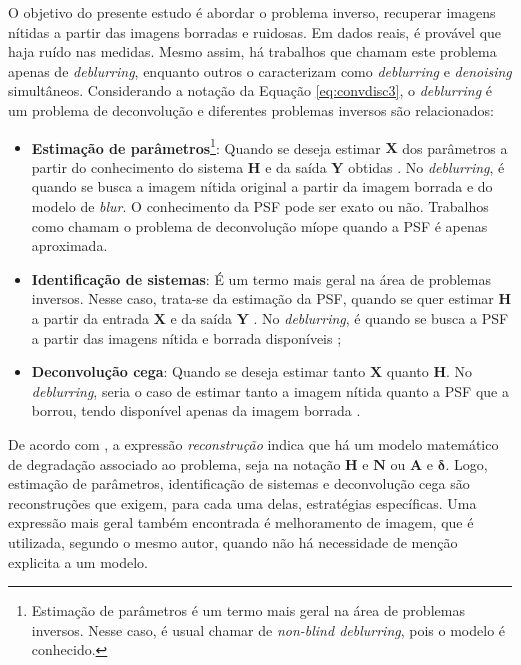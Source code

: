 O objetivo do presente estudo é abordar o problema inverso, recuperar imagens nítidas a partir das imagens borradas e ruidosas. Em dados reais, é provável que haja ruído nas medidas. Mesmo assim, há trabalhos que chamam este problema apenas de \textit{deblurring}, enquanto outros o caracterizam como \textit{deblurring} e \textit{denoising} simultâneos. Considerando a notação da Equação \eqref{eq:convdisc3}, o \textit{deblurring} é um problema de deconvolução e diferentes problemas inversos são relacionados:
\begin{itemize}
\item \textbf{Estimação de parâmetros}\footnote{Estimação de parâmetros é um termo mais geral na área de problemas inversos. Nesse caso, é usual chamar de \textit{non-blind deblurring}, pois o modelo é conhecido.}: Quando se deseja estimar $\mathbf{X}$ dos parâmetros a partir do conhecimento do sistema $\mathbf{H}$ e da saída $\mathbf{Y}$ obtidas \cite{aster2019parameter}. No \textit{deblurring}, é quando se busca a imagem nítida original a partir da imagem borrada e do modelo de \textit{blur}. O conhecimento da PSF pode ser exato ou não. Trabalhos como \cite{Bertero2009} chamam o problema de deconvolução míope quando a PSF é apenas aproximada. 


\item \textbf{Identificação de sistemas}: É um termo mais geral na área de problemas inversos. Nesse caso, trata-se da estimação da PSF, quando se quer estimar $\mathbf{H}$ a partir da entrada $\mathbf{X}$ e da saída $\mathbf{Y}$ \cite{aster2019parameter, baumeister2005topics}. No \textit{deblurring}, é quando se busca a PSF a partir das imagens nítida e borrada disponíveis \cite[págs. 15, 24]{meresescu2018};
\item \textbf{Deconvolução cega}: Quando se deseja estimar tanto $\mathbf{X}$ quanto $\mathbf{H}$. No \textit{deblurring}, seria o caso de estimar tanto a imagem nítida quanto a PSF que a borrou, tendo disponível apenas da imagem borrada \cite[págs. 99-100]{hansen2006deblurring}.
\end{itemize}

De acordo com \cite{Yu2014}, a expressão \textit{reconstrução} indica que há um modelo matemático de degradação associado ao problema, seja na notação $\mathbf{H}$ e $\mathbf{N}$ ou $\mathbf{A}$ e $\bm{\delta}$. Logo, estimação de parâmetros, identificação de sistemas e deconvolução cega são reconstruções que exigem, para cada uma delas, estratégias específicas. Uma expressão mais geral também encontrada é melhoramento de imagem, que é utilizada, segundo o mesmo autor, quando não há necessidade de menção explicita a um modelo. 

